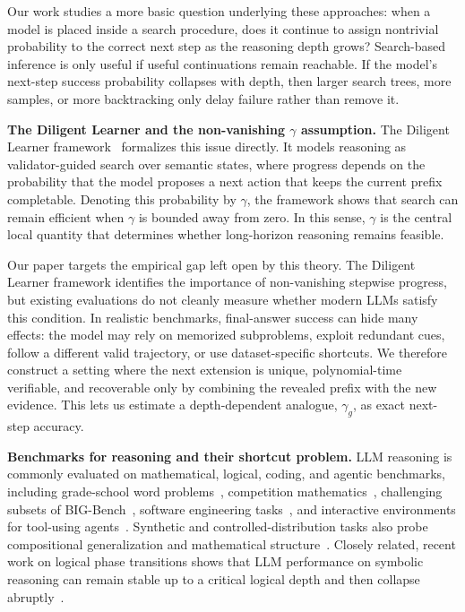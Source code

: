 \documentclass{article}
\begin{document}
Our work studies a more basic question underlying these approaches: when a model is placed inside a search procedure, does it continue to assign nontrivial probability to the correct next step as the reasoning depth grows? Search-based inference is only useful if useful continuations remain reachable. If the model's next-step success probability collapses with depth, then larger search trees, more samples, or more backtracking only delay failure rather than remove it.

\textbf{The Diligent Learner and the non-vanishing $\gamma$ assumption.\enspace}
The Diligent Learner framework~\citep{shalev2025diligent} formalizes this issue directly. It models reasoning as validator-guided search over semantic states, where progress depends on the probability that the model proposes a next action that keeps the current prefix completable. Denoting this probability by $\gamma$, the framework shows that search can remain efficient when $\gamma$ is bounded away from zero. In this sense, $\gamma$ is the central local quantity that determines whether long-horizon reasoning remains feasible.

Our paper targets the empirical gap left open by this theory. The Diligent Learner framework identifies the importance of non-vanishing stepwise progress, but existing evaluations do not cleanly measure whether modern LLMs satisfy this condition. In realistic benchmarks, final-answer success can hide many effects: the model may rely on memorized subproblems, exploit redundant cues, follow a different valid trajectory, or use dataset-specific shortcuts. We therefore construct a setting where the next extension is unique, polynomial-time verifiable, and recoverable only by combining the revealed prefix with the new evidence. This lets us estimate a depth-dependent analogue, $\gamma_g$, as exact next-step accuracy.

\textbf{Benchmarks for reasoning and their shortcut problem.\enspace}
LLM reasoning is commonly evaluated on mathematical, logical, coding, and agentic benchmarks, including grade-school word problems~\citep{cobbe2021trainingverifierssolvemath}, competition mathematics~\citep{hendrycks2021measuring}, challenging subsets of BIG-Bench~\citep{suzgun2022challengingbigbenchtaskschainofthought}, software engineering tasks~\citep{jimenez2024swebench,yang2025swebench}, and interactive environments for tool-using agents~\citep{ALFWorld20,zhou2024webarenarealisticwebenvironment,qin2024toolllm,liu2025agentbenchevaluatingllmsagents}. Synthetic and controlled-distribution tasks also probe compositional generalization and mathematical structure~\citep{frieder2025datamathematicalcopilotsbetter}. Closely related, recent work on logical phase transitions shows that LLM performance on symbolic reasoning can remain stable up to a critical logical depth and then collapse abruptly~\citep{zhang2026logicalphasetransitions}.
\end{document}
